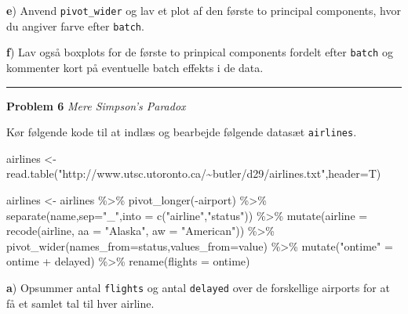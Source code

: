 \documentclass[
]{book}
\newenvironment{Shaded}{\begin{snugshade}}{\end{snugshade}}
\newcommand{\AttributeTok}[1]{\textcolor[rgb]{0.77,0.63,0.00}{#1}}
\newcommand{\FunctionTok}[1]{\textcolor[rgb]{0.00,0.00,0.00}{#1}}
\newcommand{\NormalTok}[1]{#1}
\newcommand{\OtherTok}[1]{\textcolor[rgb]{0.56,0.35,0.01}{#1}}
\newcommand{\SpecialCharTok}[1]{\textcolor[rgb]{0.00,0.00,0.00}{#1}}
\newcommand{\StringTok}[1]{\textcolor[rgb]{0.31,0.60,0.02}{#1}}
\begin{document}
\textbf{e}) Anvend \texttt{pivot\_wider} og lav et plot af den første to principal components, hvor du angiver farve efter \texttt{batch}.

\textbf{f}) Lav også boxplots for de første to prinpical components fordelt efter \texttt{batch} og kommenter kort på eventuelle batch effekts i de data.

\begin{center}\rule{0.5\linewidth}{0.5pt}\end{center}

\textbf{Problem 6} \emph{Mere Simpson's Paradox}

Kør følgende kode til at indlæs og bearbejde følgende datasæt \texttt{airlines}.

\begin{Shaded}
\begin{Highlighting}[]
\NormalTok{airlines }\OtherTok{\textless{}{-}} \FunctionTok{read.table}\NormalTok{(}\StringTok{"http://www.utsc.utoronto.ca/\textasciitilde{}butler/d29/airlines.txt"}\NormalTok{,}\AttributeTok{header=}\NormalTok{T)}

\NormalTok{airlines }\OtherTok{\textless{}{-}}\NormalTok{ airlines }\SpecialCharTok{\%\textgreater{}\%} 
  \FunctionTok{pivot\_longer}\NormalTok{(}\SpecialCharTok{{-}}\NormalTok{airport) }\SpecialCharTok{\%\textgreater{}\%} 
  \FunctionTok{separate}\NormalTok{(name,}\AttributeTok{sep=}\StringTok{"\_"}\NormalTok{,}\AttributeTok{into =} \FunctionTok{c}\NormalTok{(}\StringTok{"airline"}\NormalTok{,}\StringTok{"status"}\NormalTok{)) }\SpecialCharTok{\%\textgreater{}\%}
  \FunctionTok{mutate}\NormalTok{(}\AttributeTok{airline =} \FunctionTok{recode}\NormalTok{(airline, }\AttributeTok{aa =} \StringTok{"Alaska"}\NormalTok{, }\AttributeTok{aw =} \StringTok{"American"}\NormalTok{)) }\SpecialCharTok{\%\textgreater{}\%} 
  \FunctionTok{pivot\_wider}\NormalTok{(}\AttributeTok{names\_from=}\NormalTok{status,}\AttributeTok{values\_from=}\NormalTok{value) }\SpecialCharTok{\%\textgreater{}\%} 
  \FunctionTok{mutate}\NormalTok{(}\StringTok{"ontime"} \OtherTok{=}\NormalTok{ ontime }\SpecialCharTok{+}\NormalTok{ delayed) }\SpecialCharTok{\%\textgreater{}\%} 
  \FunctionTok{rename}\NormalTok{(}\AttributeTok{flights =}\NormalTok{ ontime)}
\end{Highlighting}
\end{Shaded}

\textbf{a}) Opsummer antal \texttt{flights} og antal \texttt{delayed} over de forskellige airports for at få et samlet tal til hver airline.
\end{document}
